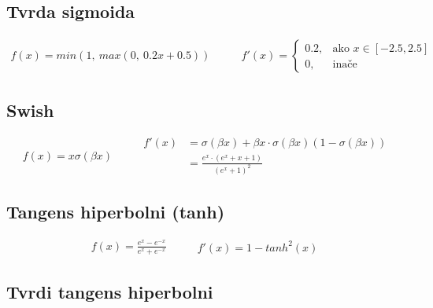 \documentclass[times, utf8, diplomski]{fer}
\begin{document}
\subsection*{Tvrda sigmoida}

\begin{equation}
\begin{split}
f(x) = min(1,\ max(0,\ 0.2x + 0.5))
\end{split}
\qquad
\begin{split}
f'(x) = 
\begin{cases}
0.2,	 		& \text{ako } x \in [-2.5, 2.5] \\
0,	& \text{inače}
\end{cases}
\end{split}
\end{equation}

\subsection*{Swish}
\begin{equation}
\begin{split}
f(x) = x \sigma(\beta x)
\end{split}
\qquad
\begin{split}
f'(x) &= \sigma(\beta x) + \beta x \cdot \sigma(\beta x)(1-\sigma(\beta x)) \\
&= \frac{e^x \cdot (e^x + x + 1)}{(e^x + 1)^2}
\end{split}
\end{equation}

\subsection*{Tangens hiperbolni (tanh)}

\begin{equation}
\begin{split}
f(x) = \frac{e^x - e^{-x}}{e^x + e^{-x}}
\end{split}
\qquad
\begin{split}
f'(x) = 1 - tanh^2(x)
\end{split}
\end{equation}

\subsection*{Tvrdi tangens hiperbolni}
\end{document}
